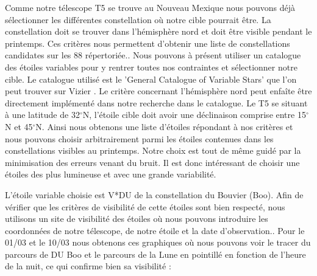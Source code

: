 \documentclass[10pt,french, openany]{book}
\begin{document}
    Comme notre télescope T5 se trouve au Nouveau Mexique nous pouvons déjà sélectionner les différentes constellation où notre cible pourrait être. La constellation doit se trouver dans l'hémisphère nord et doit être visible pendant le printemps. Ces critères nous permettent d'obtenir une liste de constellations candidates sur les 88 répertoriée.\cite{site:wiki:constellation}. Nous pouvons à présent utiliser un catalogue des étoiles variables pour y rentrer toutes nos contraintes et sélectionner notre cible. Le catalogue utilisé est le 'General Catalogue of Variable Stars' que l'on peut trouver sur Vizier \cite{site:vizier}. Le critère concernant l'hémisphère nord peut enfaîte être directement implémenté dans notre recherche dans le catalogue. Le T5 se situant à une latitude de 32$^{\circ}$N, l'étoile cible doit avoir une déclinaison comprise entre 15$^{\circ}$N et 45$^{\circ}$N. Ainsi nous obtenons une liste d'étoiles répondant à nos critères et nous pouvons choisir arbitrairement parmi les étoiles contenues dans les constellations visibles au printemps. Notre choix est tout de même guidé par la minimisation des erreurs venant du bruit. Il est donc intéressant de choisir une étoiles des plus lumineuse et avec une grande variabilité.
    
    L'étoile variable choisie est V*DU de la constellation du Bouvier (Boo). Afin de vérifier que les critères de visibilité de cette étoiles sont bien respecté, nous utilisons un site de visibilité des étoiles où nous pouvons introduire les coordonnées de notre télescope, de notre étoile et la date d'observation.\cite{site:visibilité}. Pour le 01/03 et le 10/03 nous obtenons ces graphiques où nous pouvons voir le tracer du parcours de DU Boo et le parcours de la Lune en pointillé en fonction de l'heure de la nuit, ce qui confirme bien sa visibilité :
    
\end{document}
